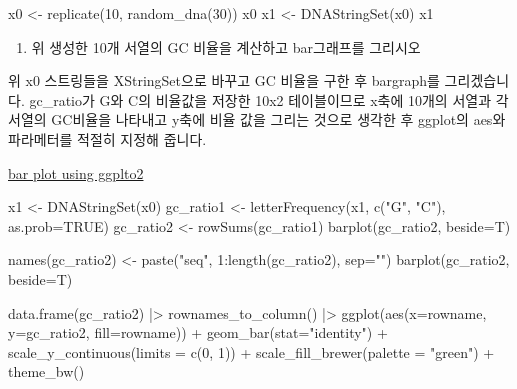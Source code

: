 \documentclass[
  a4paper,
]{book}
\newenvironment{Shaded}{\begin{snugshade}}{\end{snugshade}}
\newcommand{\AttributeTok}[1]{\textcolor[rgb]{0.40,0.45,0.13}{#1}}
\newcommand{\ConstantTok}[1]{\textcolor[rgb]{0.56,0.35,0.01}{#1}}
\newcommand{\DecValTok}[1]{\textcolor[rgb]{0.68,0.00,0.00}{#1}}
\newcommand{\FunctionTok}[1]{\textcolor[rgb]{0.28,0.35,0.67}{#1}}
\newcommand{\NormalTok}[1]{\textcolor[rgb]{0.00,0.23,0.31}{#1}}
\newcommand{\OtherTok}[1]{\textcolor[rgb]{0.00,0.23,0.31}{#1}}
\newcommand{\SpecialCharTok}[1]{\textcolor[rgb]{0.37,0.37,0.37}{#1}}
\newcommand{\StringTok}[1]{\textcolor[rgb]{0.13,0.47,0.30}{#1}}
\providecommand{\tightlist}{%
  \setlength{\itemsep}{0pt}\setlength{\parskip}{0pt}}\usepackage{longtable,booktabs,array}
\begin{document}
\begin{Shaded}
\begin{Highlighting}[]
\NormalTok{x0 }\OtherTok{\textless{}{-}} \FunctionTok{replicate}\NormalTok{(}\DecValTok{10}\NormalTok{, }\FunctionTok{random\_dna}\NormalTok{(}\DecValTok{30}\NormalTok{))}
\NormalTok{x0}
\NormalTok{x1 }\OtherTok{\textless{}{-}} \FunctionTok{DNAStringSet}\NormalTok{(x0)}
\NormalTok{x1}
\end{Highlighting}
\end{Shaded}

\begin{enumerate}
\def\labelenumi{\arabic{enumi}.}
\setcounter{enumi}{2}
\tightlist
\item
  위 생성한 10개 서열의 GC 비율을 계산하고 bar그래프를 그리시오
\end{enumerate}

위 x0 스트링들을 XStringSet으로 바꾸고 GC 비율을 구한 후 bargraph를
그리겠습니다. gc\_ratio가 G와 C의 비율값을 저장한 10x2 테이블이므로
x축에 10개의 서열과 각 서열의 GC비율을 나타내고 y축에 비율 값을 그리는
것으로 생각한 후 ggplot의 aes와 파라메터를 적절히 지정해 줍니다.

\href{https://greendaygh.github.io/kribbr2022/data-visualization.html\#bar-graph}{bar
plot using ggplto2}

\begin{Shaded}
\begin{Highlighting}[]
\NormalTok{x1 }\OtherTok{\textless{}{-}} \FunctionTok{DNAStringSet}\NormalTok{(x0)}
\NormalTok{gc\_ratio1 }\OtherTok{\textless{}{-}} \FunctionTok{letterFrequency}\NormalTok{(x1, }\FunctionTok{c}\NormalTok{(}\StringTok{"G"}\NormalTok{, }\StringTok{"C"}\NormalTok{), }\AttributeTok{as.prob=}\ConstantTok{TRUE}\NormalTok{)}
\NormalTok{gc\_ratio2 }\OtherTok{\textless{}{-}} \FunctionTok{rowSums}\NormalTok{(gc\_ratio1)}
\FunctionTok{barplot}\NormalTok{(gc\_ratio2, }\AttributeTok{beside=}\NormalTok{T)}

\FunctionTok{names}\NormalTok{(gc\_ratio2) }\OtherTok{\textless{}{-}} \FunctionTok{paste}\NormalTok{(}\StringTok{"seq"}\NormalTok{, }\DecValTok{1}\SpecialCharTok{:}\FunctionTok{length}\NormalTok{(gc\_ratio2), }\AttributeTok{sep=}\StringTok{""}\NormalTok{)}
\FunctionTok{barplot}\NormalTok{(gc\_ratio2, }\AttributeTok{beside=}\NormalTok{T)}

\FunctionTok{data.frame}\NormalTok{(gc\_ratio2) }\SpecialCharTok{|\textgreater{}} 
  \FunctionTok{rownames\_to\_column}\NormalTok{() }\SpecialCharTok{|\textgreater{}} 
  \FunctionTok{ggplot}\NormalTok{(}\FunctionTok{aes}\NormalTok{(}\AttributeTok{x=}\NormalTok{rowname, }\AttributeTok{y=}\NormalTok{gc\_ratio2, }\AttributeTok{fill=}\NormalTok{rowname)) }\SpecialCharTok{+}
  \FunctionTok{geom\_bar}\NormalTok{(}\AttributeTok{stat=}\StringTok{"identity"}\NormalTok{) }\SpecialCharTok{+}
  \FunctionTok{scale\_y\_continuous}\NormalTok{(}\AttributeTok{limits =} \FunctionTok{c}\NormalTok{(}\DecValTok{0}\NormalTok{, }\DecValTok{1}\NormalTok{)) }\SpecialCharTok{+}
  \FunctionTok{scale\_fill\_brewer}\NormalTok{(}\AttributeTok{palette =} \StringTok{"green"}\NormalTok{) }\SpecialCharTok{+}
  \FunctionTok{theme\_bw}\NormalTok{()}
\end{Highlighting}
\end{Shaded}
\end{document}
